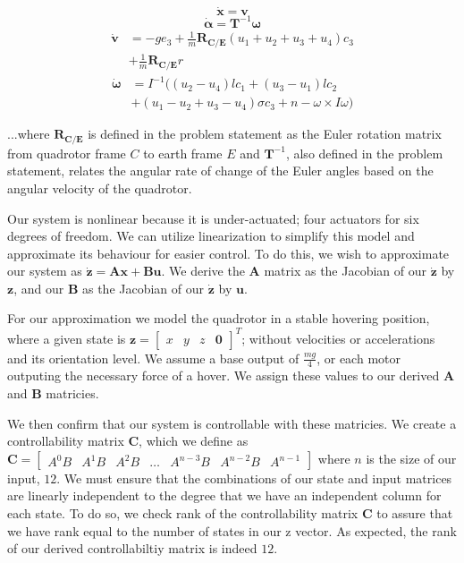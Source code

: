 \documentclass{article}
\begin{document}
\begin{multicols}{2}
\begin{equation}
    \mathbf{\dot{x}} =\mathbf{v}
\end{equation}
\begin{equation}
    \bm{\dot{\alpha}} =\mathbf{T}^{-1}\bm{\omega}
\end{equation}
\begin{align}
    \mathbf{\dot{v}} &=-ge_3+\frac{1}{m}\mathbf{R_{C/E}}(u_1+u_2+u_3+u_4)c_3 \nonumber\\ &+\frac{1}{m}\mathbf{R_{C/E}}r
\end{align}
\begin{align}
    \bm{\dot{\omega}} &=I^{-1}((u_2-u_4)lc_1+(u_3-u_1)lc_2 \nonumber\\ &+(u_1-u_2+u_3-u_4)\sigma c_3+n-\omega \times I \omega)
\end{align}

\noindent ...where $\mathbf{R_{C/E}}$ is defined in the problem statement as the Euler rotation matrix from quadrotor frame $C$ to earth frame $E$ and $\mathbf{T}^{-1}$, also defined in the problem statement, relates the angular rate of change of the Euler angles based on the angular velocity of the quadrotor.

Our system is nonlinear because it is under-actuated; four actuators for six degrees of freedom. We can utilize linearization to simplify this model and approximate its behaviour for easier control. To do this, we wish to approximate our system as $\boldsymbol{\dot{z}}=\boldsymbol{A}\boldsymbol{x}+\boldsymbol{B}\boldsymbol{u}$. We derive the $\boldsymbol{A}$ matrix as the Jacobian of our $\boldsymbol{\dot{z}}$ by $\boldsymbol{z}$, and our $\boldsymbol{B}$ as the Jacobian of our $\boldsymbol{\dot{z}}$ by $\boldsymbol{u}$. 

For our approximation we model the quadrotor in a stable hovering position, where a given state is $\boldsymbol{z}=\begin{bmatrix} 
x & y & z & \boldsymbol{0}\end{bmatrix}^T$; without velocities or accelerations and its orientation level. We assume a base output of $
\frac{mg}{4}$, or each motor outputing the necessary force of a hover. We assign these values to our derived $\boldsymbol{A}$ and 
$\boldsymbol{B}$ matricies.

We then confirm that our system is controllable with these matricies. We create a controllability matrix $\boldsymbol{C}$, 
which we define as $\boldsymbol{C} = \begin{bmatrix} A^0B & A^1B & A^2B & \dots & A^{n-3}B & A^{n-2}B & A^{n-1}\end{bmatrix}$ 
where $n$ is the size of our input, $12$. We must ensure that the combinations of our state and input matrices are linearly 
independent to the degree that we have an independent column for each state. To do so, we check rank of the controllability matrix $
\boldsymbol{C}$ to assure that we have rank equal to the number of states in our z vector. As expected, the rank of our derived 
controllabiltiy matrix is indeed $12$.


\end{multicols}
\end{document}
